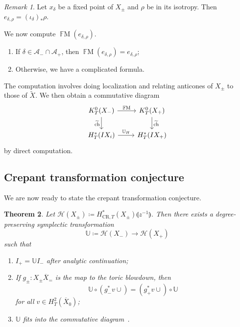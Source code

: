 \documentclass[leqno, openany]{memoir}
\newtheorem{thm}{Theorem}[section]
\theoremstyle{definition}
\theoremstyle{remark}
\newtheorem{rmk}[thm]{Remark}
\theoremstyle{plain}
\theoremstyle{definition}
\theoremstyle{remark}
\newcommand{\F}{\mathbb{F}}
\newcommand{\U}{\mathbb{U}}
\newcommand{\mc}[1]{\mathcal{#1}}
\newcommand{\mr}[1]{\mathrm{#1}}
\newcommand{\on}[1]{\operatorname{#1}}
\newcommand{\ol}[1]{\overline{#1}}
\newcommand{\wt}[1]{\widetilde{#1}}
\begin{document}
\begin{rmk}
    Let $x_{\delta}$ be a fixed point of $X_{\pm}$ and $\rho$ be in its isotropy. Then $e_{\delta, \rho} = (\iota_{\delta})_* \rho$.
\end{rmk}

We now compute $\on{\F M}(e_{\delta, \rho})$.
\begin{enumerate}
    \item If $\delta \in \mc{A}_- \cap \mc{A}_+$, then $\on{\F M}(e_{\delta, \rho}) = e_{\delta, \rho}$;
    \item Otherwise, we have a complicated formula.
\end{enumerate}
The computation involves doing localization and relating anticones of $X_{\pm}$ to those of $\wt{X}$. We then obtain a commutative diagram
\begin{equation}\label{eqn:fmsympl}
\begin{tikzcd}
    K_T^0(X_-) \ar{r}{\on{\F M}} \ar[swap]{d}{\wt{\on{ch}}} & K_T^0(X_+) \ar{d}{\wt{\on{ch}}} \\
    H_T^*(IX_i) \ar{r}{\mathbb{U}_H} & H_T^*(IX_+)
\end{tikzcd}
\end{equation}
by direct computation.

\subsection{Crepant transformation conjecture}%
\label{sub:Crepant transformation conjecture}

We are now ready to state the crepant transformation conjecture.
\begin{thm}
    Let $\mc{H}(X_{\pm}) \coloneqq H_{\mr{CR}, T}^*(X_{\pm}) \llparenthesis z^{-1} \rrparenthesis$. Then there exists a degree-preserving symplectic transformation
    \[ \U \coloneqq \mc{H}(X_-) \to \mc{H}(X_+) \]
    such that
    \begin{enumerate}
        \item $I_+ = \U I_-$ after analytic continuation;
        \item If $g_{\pm} \colon X_{\pm} \ol{X}_=$ is the map to the toric blowdown, then
            \[ \U \circ (g_-^* v \cup) = (g_+^* v \cup) \circ \U \]
            for all $v \in H^2_T(\ol{X}_0)$;
        \item $\U$ fits into the commutative diagram~.
    \end{enumerate}
\end{thm}
\end{document}
